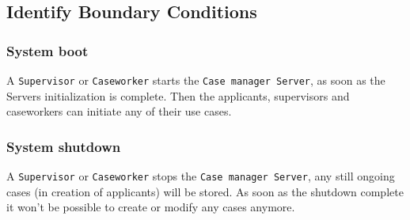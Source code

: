 \subsection{Identify Boundary Conditions}
    \subsubsection{System boot}
    A \texttt{Supervisor} or \texttt{Caseworker} starts the \texttt{Case manager Server}, as soon as the Servers initialization is complete. Then the applicants, supervisors and caseworkers can initiate any of their use cases. 
    
    \subsubsection{System shutdown}
    A \texttt{Supervisor} or \texttt{Caseworker} stops the \texttt{Case manager Server}, any still ongoing cases (in creation of applicants) will be stored.
    As soon as the shutdown complete it won't be possible to create or modify any cases anymore.